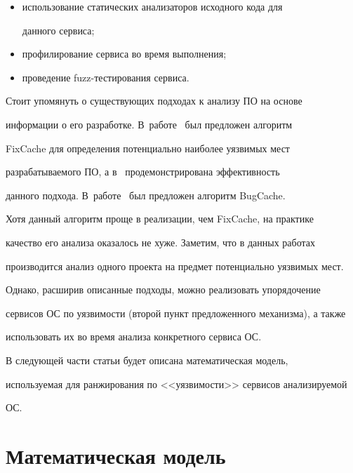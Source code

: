 \begin{enumerate}[1.]
\begin{itemize}
\begin{itemize}


\item использование статических анализаторов исходного кода для 


данного сервиса;


\item профилирование сервиса во время выполнения;


\item проведение fuzz-тестирования сервиса.


\end{itemize}


\end{itemize}


\end{enumerate}


  


  Стоит упомянуть о существующих подходах к анализу ПО на основе 


информации о его разработке. В~работе~\cite{3-mi} был предложен алгоритм 


FixCache для определения потенциально наиболее уязвимых мест 


разрабатываемого ПО, а в~\cite{4-mi} продемонстрирована эффективность 


данного подхода. В~работе~\cite{5-mi} был предложен алгоритм BugCache. 


Хотя данный алгоритм проще в реализации, чем FixCache, на практике  


качество его анализа оказалось не хуже. Заметим, что в данных работах 


производится анализ одного проекта на предмет потенциально уязвимых мест. 


Однако, расширив описанные подходы, можно реализовать упорядочение 


сервисов ОС по уязвимости (второй пункт предложенного механизма), а также 


использовать их во время анализа конкретного сервиса ОС.


  


  В следующей части статьи будет описана математическая модель, 


использу\-емая для ранжирования по <<уязвимости>> сервисов анализируемой 


ОС.


  


\section{Математическая модель}


